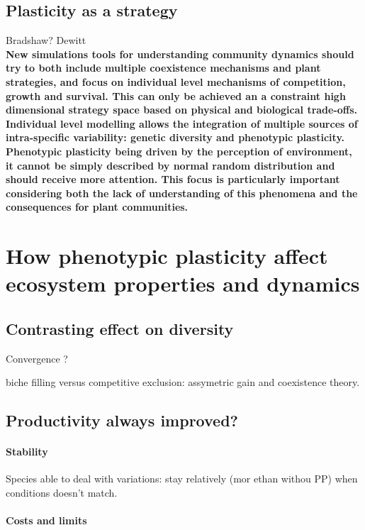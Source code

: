 \subsection{Plasticity as a strategy}
Bradshaw?
Dewitt\\



\textbf{New simulations tools for understanding community dynamics should try to both include multiple coexistence mechanisms and plant strategies, and focus on individual level mechanisms of competition, growth and survival. This can only be achieved an a constraint high dimensional strategy space based on physical and biological trade-offs. Individual level modelling allows the integration of multiple sources of intra-specific variability: genetic diversity and phenotypic plasticity. Phenotypic plasticity being driven by the perception of environment, it cannot be simply described by normal random distribution and should receive more attention. This focus is particularly important considering both the lack of understanding of this phenomena and the consequences for plant communities.  }


\section{How phenotypic plasticity affect ecosystem properties and dynamics}

\subsection{Contrasting effect on diversity}

Convergence ?

biche filling versus competitive exclusion: assymetric gain and coexistence theory.

\subsection{Productivity always improved?}

\paragraph{Stability}

Species able to deal with variations: stay relatively (mor ethan withou PP) when conditions doesn't match.


\paragraph{Costs and limits}

